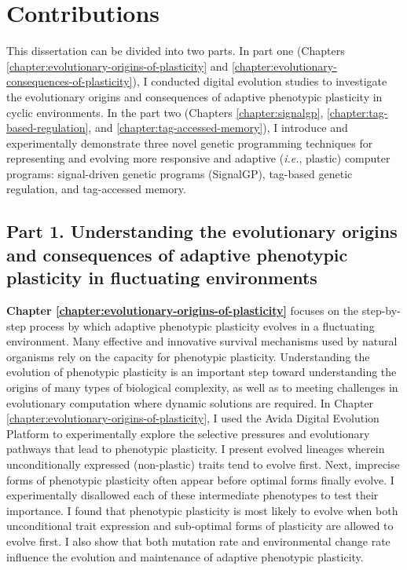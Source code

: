 \section{Contributions}


This dissertation can be divided into two parts.
In part one (Chapters \ref{chapter:evolutionary-origins-of-plasticity} and \ref{chapter:evolutionary-consequences-of-plasticity}), I conducted digital evolution studies to investigate the evolutionary origins and consequences of adaptive phenotypic plasticity in cyclic environments.
In the part two (Chapters \ref{chapter:signalgp}, \ref{chapter:tag-based-regulation}, and \ref{chapter:tag-accessed-memory}), I introduce and experimentally demonstrate three novel genetic programming techniques for representing and evolving more responsive and adaptive (\textit{i.e.}, plastic) computer programs: signal-driven genetic programs (SignalGP), tag-based genetic regulation, and tag-accessed memory.

\subsection{Part 1. Understanding the evolutionary origins and consequences of adaptive phenotypic plasticity in fluctuating environments}

\textbf{Chapter \ref{chapter:evolutionary-origins-of-plasticity}} focuses on the step-by-step process by which adaptive phenotypic plasticity evolves in a fluctuating environment.
Many effective and innovative survival mechanisms used by natural organisms rely on the capacity for phenotypic plasticity.
Understanding the evolution of phenotypic plasticity is an important step toward understanding the origins of many types of biological complexity, as well as to meeting challenges in evolutionary computation where dynamic solutions are required.
In Chapter \ref{chapter:evolutionary-origins-of-plasticity}, I used the Avida Digital Evolution Platform to experimentally explore the selective pressures and evolutionary pathways that lead to phenotypic plasticity.  
I present evolved lineages wherein unconditionally expressed (non-plastic) traits tend to evolve first.
Next, imprecise forms of phenotypic plasticity often appear before optimal forms finally evolve.   
I experimentally disallowed each of these intermediate phenotypes to test their importance.
I found that phenotypic plasticity is most likely to evolve when both unconditional trait expression and sub-optimal forms of plasticity are allowed to evolve first.
I also show that both mutation rate and environmental change rate influence the evolution and maintenance of adaptive phenotypic plasticity.

